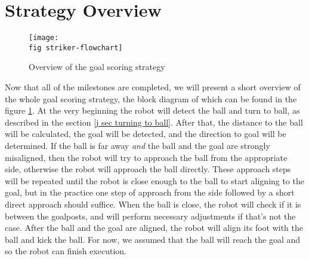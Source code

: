 \section{Strategy Overview}
\label{p sec overview}

\begin{figure}
  \texttt{[image: \\fig striker-flowchart]}
  \caption{Overview of the goal scoring strategy}
  \label{p figure strategy-overview}
\end{figure}

Now that all of the milestones are completed, we will present a short overview
of the whole goal scoring strategy, the block diagram of which can be found in
the figure \ref{p figure strategy-overview}. At the very beginning the robot
will detect the ball and turn to ball, as described in the section \ref{j sec
  turning to ball}. After that, the distance to the ball will be calculated,
the goal will be detected, and the direction to goal will be determined. If the
ball is far away \textit{and} the ball and the goal are strongly misaligned,
then the robot will try to approach the ball from the appropriate side,
otherwise the robot will approach the ball directly. These approach steps will
be repeated until the robot is close enough to the ball to start aligning to
the goal, but in the practice one step of approach from the side followed by a
short direct approach should suffice. When the ball is close, the robot will
check if it is between the goalposts, and will perform necessary adjustments if
that's not the case. After the ball and the goal are aligned, the robot will
align its foot with the ball and kick the ball. For now, we assumed that the
ball will reach the goal and so the robot can finish execution.
